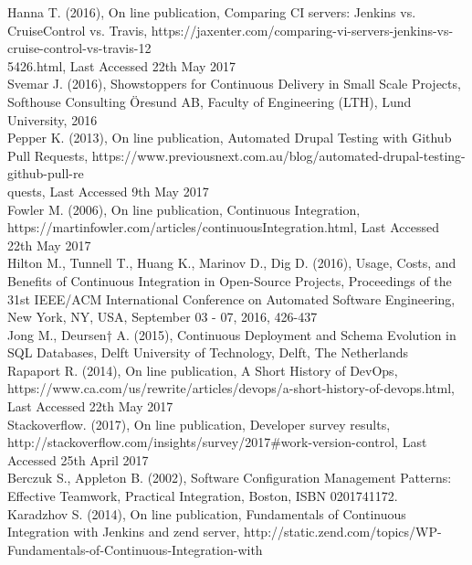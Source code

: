 \begin{thebibliography}{0}
Hanna T. (2016), On line publication, Comparing CI servers: Jenkins vs. CruiseControl vs. Travis, https://jaxenter.com/comparing-vi-servers-jenkins-vs-cruise-control-vs-travis-12\\5426.html, Last Accessed 22th May 2017
\\
Svemar J. (2016), Showstoppers for Continuous Delivery in Small Scale Projects, Softhouse Consulting Öresund AB, Faculty of Engineering (LTH), Lund University, 2016
\\
Pepper K. (2013), On line publication, Automated Drupal Testing with Github Pull Requests, https://www.previousnext.com.au/blog/automated-drupal-testing-github-pull-re\\quests, Last Accessed 9th May 2017
\\
Fowler M. (2006),  On line publication, Continuous Integration, https://martinfowler.com/articles/continuousIntegration.html, Last Accessed 22th May 2017
\\
Hilton M., Tunnell T., Huang K., Marinov D., Dig D. (2016), Usage, Costs, and Benefits of Continuous Integration in Open-Source Projects, Proceedings of the 31st IEEE/ACM International Conference on Automated Software Engineering, New York, NY, USA, September 03 - 07, 2016, 426-437
\\
Jong M., Deursen† A. (2015), Continuous Deployment and Schema Evolution in SQL Databases, Delft University of Technology, Delft, The Netherlands
\\
Rapaport R. (2014), On line publication, A Short History of DevOps, https://www.ca.com/us/rewrite/articles/devops/a-short-history-of-devops.html, Last Accessed 22th May 2017
\\
Stackoverflow. (2017), On line publication, Developer survey results, http://stackoverflow.com/insights/survey/2017\#work-version-control, Last Accessed 25th April 2017
\\
Berczuk S., Appleton B. (2002), Software Configuration Management Patterns: Effective Teamwork, Practical Integration, Boston, ISBN 0201741172.
\\
Karadzhov S. (2014), On line publication, Fundamentals of Continuous Integration with Jenkins and zend server, http://static.zend.com/topics/WP-Fundamentals-of-Continuous-Integration-with\\

\end{thebibliography}
